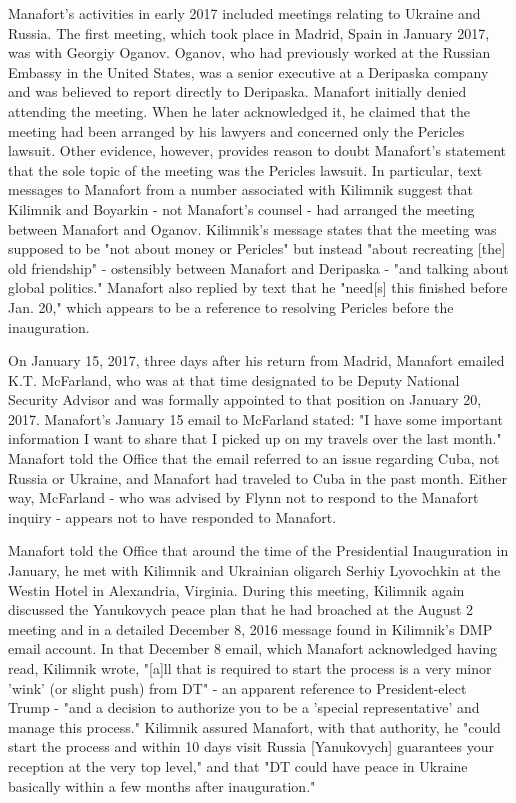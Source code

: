 Manafort's activities in early 2017 included meetings relating to Ukraine and Russia.
The first meeting, which took place in Madrid, Spain in January 2017, was with Georgiy Oganov.
Oganov, who had previously worked at the Russian Embassy in the United States, was a senior executive at a Deripaska company and was believed to report directly to Deripaska.%
Manafort initially denied attending the meeting.
When he later acknowledged it, he claimed that the meeting had been arranged by his lawyers and concerned only the Pericles lawsuit.%
Other evidence, however, provides reason to doubt Manafort's statement that the sole topic of the meeting was the Pericles lawsuit.
In particular, text messages to Manafort from a number associated with Kilimnik suggest that Kilimnik and Boyarkin - not Manafort's counsel - had arranged the meeting between Manafort and Oganov.%
Kilimnik's message states that the meeting was supposed to be "not about money or Pericles" but instead "about recreating [the] old friendship" - ostensibly between Manafort and Deripaska - "and talking about global politics."%
Manafort also replied by text that he "need[s] this finished before Jan. 20,"%
which appears to be a reference to resolving Pericles before the inauguration.

On January 15, 2017, three days after his return from Madrid, Manafort emailed K.T. McFarland, who was at that time designated to be Deputy National Security Advisor and was formally appointed to that position on January 20, 2017.%
Manafort's January 15 email to McFarland stated: "I have some important information I want to share that I picked up on my travels over the last month."%
Manafort told the Office that the email referred to an issue regarding Cuba, not Russia or Ukraine, and Manafort had traveled to Cuba in the past month.%
Either way, McFarland - who was advised by Flynn not to respond to the Manafort inquiry - appears not to have responded to Manafort.%

Manafort told the Office that around the time of the Presidential Inauguration in January, he met with Kilimnik and Ukrainian oligarch Serhiy Lyovochkin at the Westin Hotel in Alexandria, Virginia.%
During this meeting, Kilimnik again discussed the Yanukovych peace plan that he had broached at the August 2 meeting and in a detailed December 8, 2016 message found in Kilimnik's DMP email account.%
In that December 8 email, which Manafort acknowledged having read,%
Kilimnik wrote, "[a]ll that is required to start the process is a very minor 'wink' (or slight push) from DT" - an apparent reference to President-elect Trump - "and a decision to authorize you to be a 'special representative' and manage this process."
Kilimnik assured Manafort, with that authority, he "could start the process and within 10 days visit Russia [Yanukovych] guarantees your reception at the very top level," and that "DT could have peace in Ukraine basically within a few months after inauguration."%

